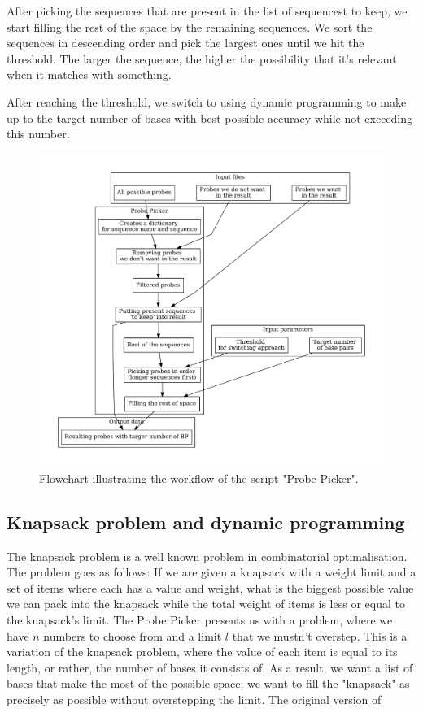 After picking the sequences that are present in the list of sequencest to keep, we start filling the rest of the space by the remaining sequences. We sort the 
sequences in descending order and pick the largest ones until we hit the threshold. The larger the sequence, the higher the possibility that it's relevant 
when it matches with something. 

After reaching the threshold, we switch to using dynamic programming to make up to the target number of bases with best possible accuracy while not exceeding this 
number. 

\begin{figure}
\centerline{
	\includegraphics[width=1\textwidth]{graphs/probe_picker_workflow}
}
\caption[Workflow of Probe Picker script]{Flowchart illustrating the workflow of the script "Probe Picker".}
\label{obr:probe_picker}
\end{figure}


\subsection{Knapsack problem and dynamic programming}
The knapsack problem is a well known problem in combinatorial optimalisation. The problem goes as follows: If we are given a knapsack with a weight limit and a 
set of items where each has a value and weight, what is the biggest possible value we can pack into the knapsack while the total weight of items is less or equal to 
the knapsack's limit. 
The Probe Picker presents us with a problem, where we have $n$ numbers to choose from and a limit $l$ that we mustn't overstep. This is a variation of the knapsack problem, 
where the value of each item is equal to its length, or rather, the number of bases it consists of. As a result, we want a list of bases that make the most of the possible space; 
we want to fill the "knapsack" as precisely as possible without overstepping the limit. 
The original version of 


